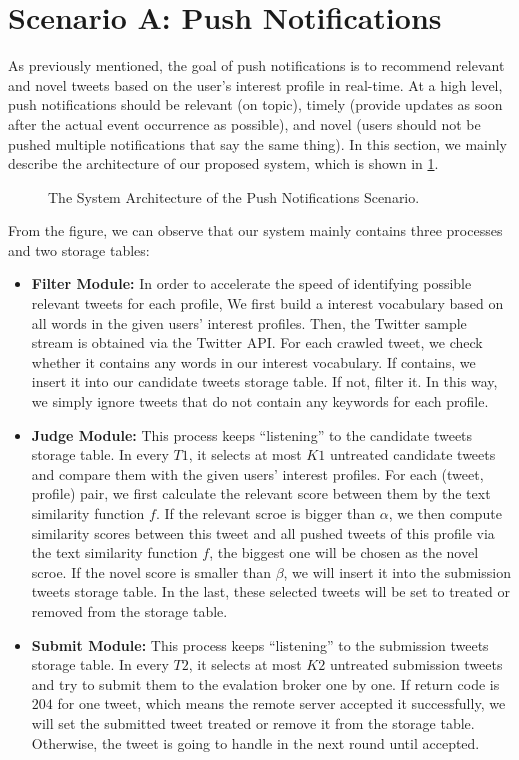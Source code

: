 \section{Scenario A: Push Notifications}
As previously mentioned, the goal of push notifications is to recommend relevant and
novel tweets based on the user’s interest profile in real-time.
At a high level, push notifications should be relevant (on topic),
timely (provide updates as soon after the actual event occurrence as possible),
and novel (users should not be pushed multiple notifications that say the same thing).
In this section, we mainly describe the architecture of our proposed system, which is shown in \ref{fig:a}.

\begin{figure}[htbp]
\caption{The System Architecture of the Push Notifications Scenario.}
\label{fig:a}
\end{figure}

From the figure, we can observe that our system mainly contains three processes and two storage tables:

\begin{itemize}
\item \textbf{Filter Module:} 
In order to accelerate the speed of identifying possible relevant tweets for each profile,
We first build a interest vocabulary based on all words in the given users' interest profiles.
Then, the Twitter sample stream is obtained via the Twitter API.
For each crawled tweet, we check whether it contains any words in our interest vocabulary.
If contains, we insert it into our candidate tweets storage table. If not, filter it.
In this way, we simply ignore tweets that do not contain any keywords for each profile.

\item \textbf{Judge Module:}
This process keeps ``listening'' to the candidate tweets storage table.
In every $T1$, it selects at most $K1$ untreated candidate tweets and compare them with the given users' interest profiles.
For each (tweet, profile) pair, we first calculate the relevant score between them by the text similarity function $f$.
If the relevant scroe is bigger than $\alpha$, we then compute similarity scores between this tweet and all pushed tweets of this profile
via the text similarity function $f$, the biggest one will be chosen as the novel scroe.
If the novel score is smaller than $\beta$, we will insert it into the submission tweets storage table.
In the last, these selected tweets will be set to treated or removed from the storage table.

\item \textbf{Submit Module:}
This process keeps ``listening'' to the submission tweets storage table.
In every $T2$, it selects at most $K2$ untreated submission tweets and try to submit them to the evalation broker one by one.
If return code is $204$ for one tweet, which means the remote server accepted it successfully,
we will set the submitted tweet treated or remove it from the storage table.
Otherwise, the tweet is going to handle in the next round until accepted.
\end{itemize}

